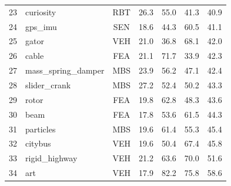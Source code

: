\begin{table}[htbp]
{\begin{tabular}{rlccccc}
    23 & curiosity & RBT & 26.3 & 55.0 & 41.3 & 40.9 \\
    24 & gps\_imu & SEN & 18.6 & 44.3 & 60.5 & 41.1 \\
    25 & gator & VEH & 21.0 & 36.8 & 68.1 & 42.0 \\
    26 & cable & FEA & 21.1 & 71.7 & 33.9 & 42.3 \\
    27 & mass\_spring\_damper & MBS & 23.9 & 56.2 & 47.1 & 42.4 \\
    28 & slider\_crank & MBS & 27.2 & 52.4 & 50.2 & 43.3 \\
    29 & rotor & FEA & 19.8 & 62.8 & 48.3 & 43.6 \\
    30 & beam & FEA & 17.8 & 53.6 & 61.5 & 44.3 \\
    31 & particles & MBS & 19.6 & 61.4 & 55.3 & 45.4 \\
    32 & citybus & VEH & 19.6 & 50.4 & 67.4 & 45.8 \\
    33 & rigid\_highway & VEH & 21.2 & 63.6 & 70.0 & 51.6 \\
    34 & art & VEH & 17.9 & 82.2 & 75.8 & 58.6 \\
    \bottomrule
    \end{tabular}
    }
\end{table}

